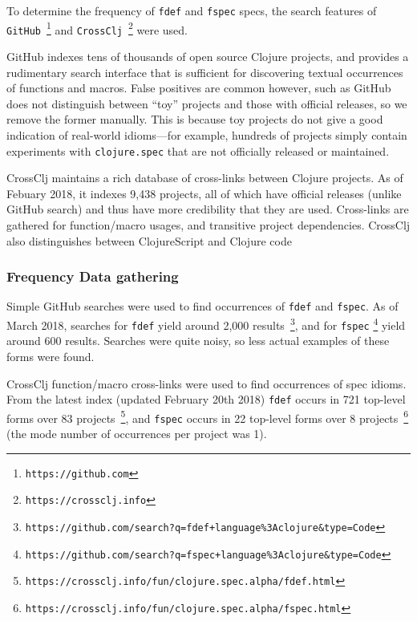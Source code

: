 To determine the frequency of \texttt{fdef} and \texttt{fspec} specs,
the search features of \texttt{GitHub}~\footnote{\texttt{https://github.com}} and 
\texttt{CrossClj}~\footnote{\texttt{https://crossclj.info}} were used.

GitHub indexes tens of thousands of open source Clojure projects, and provides
a rudimentary search interface that is sufficient for discovering textual occurrences 
of functions and macros. False positives are common however, such as
GitHub does not distinguish
between ``toy'' projects and those with official releases, so we remove the former manually.
This is because toy projects do not give a good indication of real-world idioms---for example,
hundreds of projects simply contain experiments with \texttt{clojure.spec} that
are not officially released or maintained.

CrossClj maintains a rich database of cross-links between Clojure projects.
As of Febuary 2018, it indexes 9,438 projects, all of which have official releases (unlike
GitHub search) and thus have more credibility that they are used.
Cross-links are gathered for function/macro usages, and transitive project dependencies.
CrossClj also distinguishes between ClojureScript and Clojure code

\subsubsection{Frequency Data gathering}

Simple GitHub searches were used to find occurrences of \texttt{fdef} and \texttt{fspec}.
As of March 2018,
searches for \texttt{fdef}
yield around 2,000 results~\footnote{\texttt{https://github.com/search?q=fdef+language\%3Aclojure\&type=Code}},
and for \texttt{fspec} 
\footnote{\texttt{https://github.com/search?q=fspec+language\%3Aclojure\&type=Code}}
yield around 600 results.
Searches were quite noisy, so less actual examples of these forms were found.

CrossClj function/macro cross-links were used to find occurrences of spec idioms.
From the latest index (updated February 20th 2018)
\texttt{fdef} occurs in 721 top-level forms over 83 
projects~\footnote{\texttt{https://crossclj.info/fun/clojure.spec.alpha/fdef.html}}, and
\texttt{fspec} occurs in 22 top-level forms over 8 
projects~\footnote{\texttt{https://crossclj.info/fun/clojure.spec.alpha/fspec.html}}
(the mode number of occurrences per project was 1).

